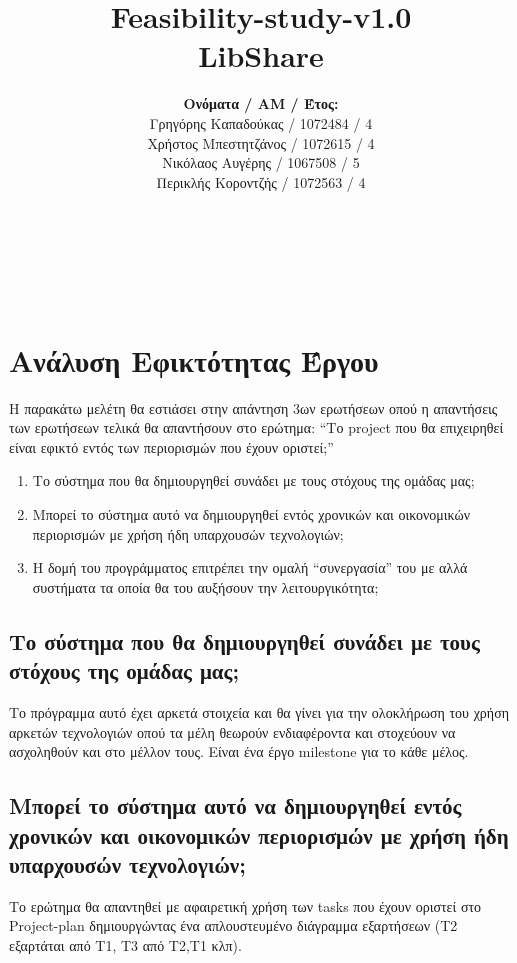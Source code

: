 \documentclass[12pt,a4paper]{article}
\title{Feasibility-study-v1.0 \\ LibShare}
\author{\textbf{Ονόματα / ΑΜ / Έτος:} \\ Γρηγόρης Καπαδούκας / 1072484 / 4\textdegree \\ Χρήστος Μπεστητζάνος / 1072615 / 4\textdegree \\ Νικόλαος Αυγέρης / 1067508 / 5\textdegree \\ Περικλής Κοροντζής / 1072563 / 4\textdegree}
\begin{document}
\makeatletter
\begin{center}
	\LARGE{\@title} \\
	\pagebreak
\end{center}
\begin{LARGE}\@author\end{LARGE} \\
\pagebreak

\section{Ανάλυση Εφικτότητας Έργου}

Η παρακάτω μελέτη θα εστιάσει στην απάντηση 3ων ερωτήσεων οπού η απαντήσεις των ερωτήσεων τελικά θα απαντήσουν στο ερώτημα:
“Το project που θα επιχειρηθεί είναι εφικτό εντός των περιορισμών που έχουν οριστεί;”

\begin{enumerate}
	\item Το σύστημα που θα δημιουργηθεί συνάδει με τους στόχους της ομάδας μας;
	\item Μπορεί το σύστημα αυτό να δημιουργηθεί εντός  χρονικών και οικονομικών περιορισμών με χρήση ήδη υπαρχουσών τεχνολογιών;
	\item Η δομή του προγράμματος επιτρέπει την ομαλή “συνεργασία” του με αλλά συστήματα τα οποία θα του αυξήσουν την λειτουργικότητα;
\end{enumerate}


\subsection{Το σύστημα που θα δημιουργηθεί συνάδει με τους στόχους της ομάδας μας;}

Το πρόγραμμα αυτό έχει αρκετά στοιχεία και θα γίνει για την ολοκλήρωση του χρήση αρκετών τεχνολογιών οπού τα μέλη θεωρούν ενδιαφέροντα και στοχεύουν να ασχοληθούν και στο μέλλον τους. Είναι ένα έργο milestone για το κάθε μέλος.

\subsection{Μπορεί το σύστημα αυτό να δημιουργηθεί εντός  χρονικών και οικονομικών περιορισμών με χρήση ήδη υπαρχουσών τεχνολογιών;}

Το  ερώτημα θα απαντηθεί με αφαιρετική χρήση των tasks που έχουν οριστεί στο Project-plan δημιουργώντας ένα απλουστευμένο διάγραμμα εξαρτήσεων (Τ2 εξαρτάται από Τ1, Τ3 από Τ2,Τ1 κλπ).
\end{document}
